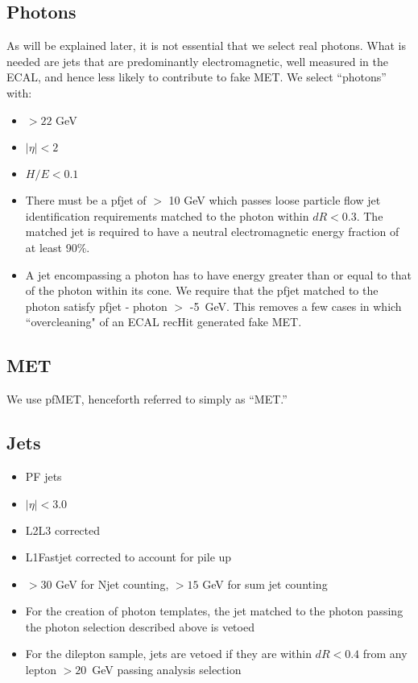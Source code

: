\subsection{Photons}

As will be explained later, it is not essential that we select real photons. 
What is needed are jets that are predominantly electromagnetic, well measured in the ECAL, and hence less likely to contribute to fake MET. We select ``photons'' with:

\begin{itemize}
\item \pt $ > 22$ GeV
\item $|\eta| < 2$
\item $H/E < 0.1$
\item There must be a pfjet of \pt $ >$ 10 GeV which passes loose particle flow jet identification requirements matched to the photon within $dR < 0.3$. The matched jet is required to have a neutral electromagnetic energy fraction of at least 
90\%.

\item A jet encompassing a photon has to have energy greater than or equal to that of the photon within its cone. We require that the pfjet \pt matched to the photon satisfy pfjet \pt - photon \pt $>$ -5~GeV. This removes a few cases in which ``overcleaning" of an ECAL recHit generated fake MET.

\end{itemize}

\subsection{MET}

We use pfMET, henceforth referred to simply as ``MET.''

\subsection{Jets}

\begin{itemize}
\item PF jets
\item $|\eta| < 3.0$ %
\item L2L3 corrected
\item L1Fastjet corrected to account for pile up
\item \pt $ > 30$ GeV for Njet counting, \pt $ > 15$ GeV for sum jet \pt counting
\item For the creation of photon templates, the jet matched to the photon passing the photon selection described above is vetoed
\item For the dilepton sample, jets are vetoed if they are within $dR < 0.4$ from any lepton \pt $ > 20$~GeV passing analysis selection
\end{itemize}

